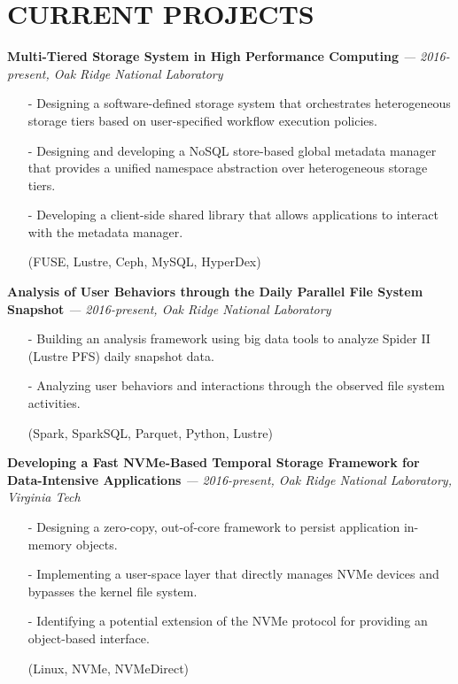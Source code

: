 \section{CURRENT PROJECTS}
\vspace{.03in}
  {\bf Multi-Tiered Storage System in High Performance Computing}
   {\it \footnotesize --- 2016-present, Oak Ridge National Laboratory}
   \begin{itemize}[leftmargin=*]
    \setlength\itemsep{-0.02in}
    \item[-] Designing a software-defined storage system that orchestrates
	     heterogeneous storage tiers based on user-specified workflow execution
             policies.
    \item[-] Designing and developing a NoSQL store-based global metadata manager
	     that provides a unified namespace abstraction over heterogeneous
	     storage tiers.
    \item[-] Developing a client-side shared library that allows applications to interact
             with the metadata manager.
    \item[] {\small(FUSE, Lustre, Ceph, MySQL, HyperDex)}
   \end{itemize}
  \vspace{-0.15in}
  {\bf Analysis of User Behaviors through the Daily Parallel File System Snapshot}
   {\it \footnotesize --- 2016-present, Oak Ridge National Laboratory}
   \begin{itemize}[leftmargin=*]
    \setlength\itemsep{-0.02in}
    \item[-] Building an analysis framework using big data tools to analyze Spider II (Lustre PFS) daily snapshot data.
    \item[-] Analyzing user behaviors and interactions through the observed file system activities.
    \item[] {\small(Spark, SparkSQL, Parquet, Python, Lustre)}
   \end{itemize}
  \vspace{-0.15in}
  {\bf Developing a Fast NVMe-Based Temporal Storage Framework for Data-Intensive Applications}
   {\it \footnotesize --- 2016-present, Oak Ridge National Laboratory, Virginia Tech}
   \begin{itemize}[leftmargin=*]
    \setlength\itemsep{-0.02in}
    \item[-] Designing a zero-copy, out-of-core framework to persist application in-memory objects.
    \item[-] Implementing a user-space layer that directly manages NVMe
             devices and bypasses the kernel file system.
    \item[-] Identifying a potential extension of the NVMe protocol for providing an object-based interface.
    \item[] {\small(Linux, NVMe, NVMeDirect)}
   \end{itemize}
 
